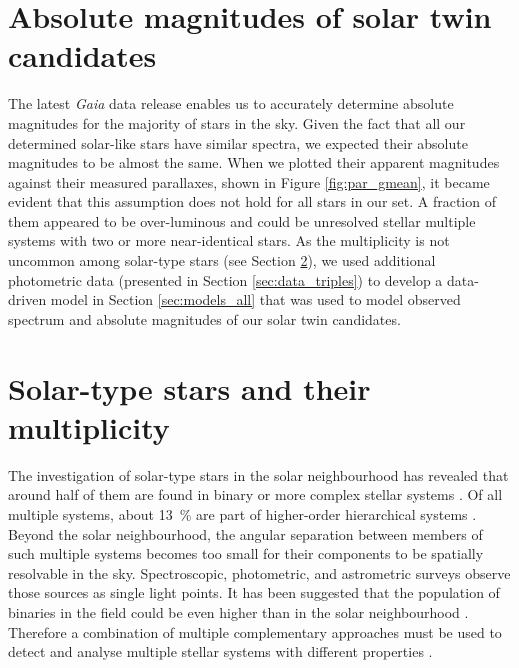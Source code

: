 \section{Absolute magnitudes of solar twin candidates}
\label{sec:abs_mag_triple}
The latest {\it Gaia} data release enables us to accurately determine absolute magnitudes for the majority of stars in the sky. Given the fact that all our determined solar-like stars have similar spectra, we expected their absolute magnitudes to be almost the same. When we plotted their apparent magnitudes against their measured parallaxes, shown in Figure \ref{fig:par_gmean}, it became evident that this assumption does not hold for all stars in our set. A fraction of them appeared to be over-luminous and could be unresolved stellar multiple systems with two or more near-identical stars. As the multiplicity is not uncommon among solar-type stars (see Section \ref{sec:multiplicity_intro_twins}), we used additional photometric data (presented in Section \ref{sec:data_triples}) to develop a data-driven model in Section \ref{sec:models_all} that was used to model observed spectrum and absolute magnitudes of our solar twin candidates.

\section{Solar-type stars and their multiplicity}
\label{sec:multiplicity_intro_twins}
The investigation of solar-type stars in the solar neighbourhood has revealed that around half of them are found in binary or more complex stellar systems \cite{2010ApJS..190....1R, 2013ARA&A..51..269D, 2017ApJS..230...15M}. Of all multiple systems, about 13~\% are part of higher-order hierarchical systems \cite{2010ApJS..190....1R, 2014AJ....147...87T}. Beyond the solar neighbourhood, the angular separation between members of such multiple systems becomes too small for their components to be spatially resolvable in the sky. Spectroscopic, photometric, and astrometric surveys observe those sources as single light points. It has been suggested that the population of binaries in the field could be even higher than in the solar neighbourhood \cite{2000A&A...361..770Q}. Therefore a combination of multiple complementary approaches must be used to detect and analyse multiple stellar systems with different properties \cite{2017ApJS..230...15M}.

